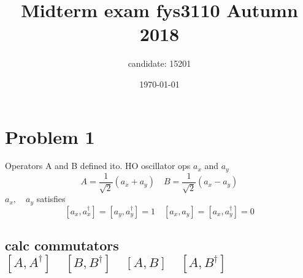 \documentclass[a4paper]{article}
\title{Midterm exam fys3110 Autumn 2018}
\author{candidate: 15201}
\date{\today}
\begin{document}
\maketitle

\section{Problem 1}
Operators A and B defined ito. HO oscillator ops $a_x$ and $a_y$
\[
    A = \frac{1}{\sqrt{2}}(a_x + a_y) \quad B = \frac{1}{\sqrt{2}}(a_x - a_y)
\]
$a_x, \quad a_y$ satisfies 
\[ [a_x, a_x^{\dagger}] = [a_y, a_y^{\dagger}] = 1 \quad [a_x, a_y] = [a_x, a_y^{\dagger}] = 0 \]

\subsection{calc commutators $[A, A^{\dagger}] \quad [B,B^{\dagger}] \quad [A,B] \quad [A,B^{\dagger}]$}
\end{document}
